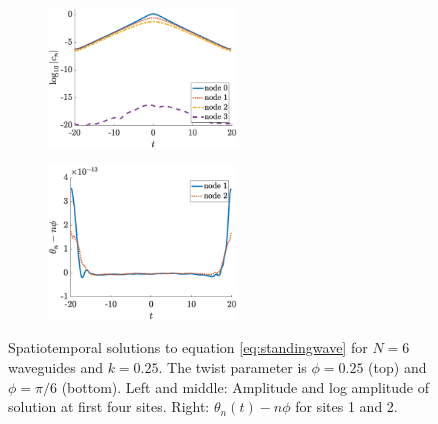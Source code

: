 \documentclass[11pt,reqno]{amsart}
\begin{document}
\begin{figure}
\begin{subfigure}{0.3\linewidth}
    \end{subfigure}
    \begin{subfigure}{0.3\linewidth}
        \caption{}
        \label{fig:m6pi6logamp}
        \includegraphics[width=5cm]{m6phipi6logamp.eps}
    \end{subfigure}
        \begin{subfigure}{0.3\linewidth}
        \caption{}
        \label{fig:m6pi6phase}
        \includegraphics[width=5cm]{m6phipi6phase.eps}
    \end{subfigure}
    \caption{Spatiotemporal solutions to equation \cref{eq:standingwave} for $N=6$ waveguides and $k=0.25$. The twist parameter is $\phi = 0.25$ (top) and $\phi = \pi/6$ (bottom). Left and middle: Amplitude and log amplitude of solution at first four sites. Right: $\theta_n(t) - n \phi$ for sites 1 and 2.}
    \label{fig:m6sol}
\end{figure}
\end{document}

